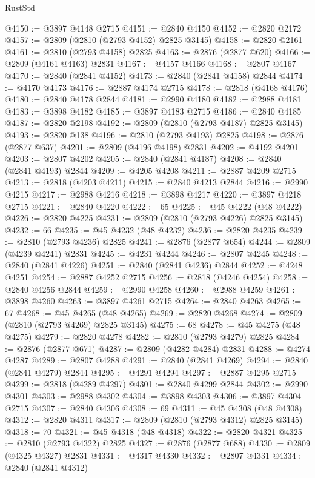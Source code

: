 \begin{lexlean}{RustStd}
\begin{coremodule}
@4150 := @3897 @4148 @2715
@4151 := @2840 @4150
@4152 := @2820 @2172
@4157 := @2809 (@2810 (@2793 @4152) @2825 @3145)
@4158 := @2820 @2161
@4161 := @2810 (@2793 @4158) @2825
@4163 := @2876 (@2877 @620)
@4166 := @2809 (@4161 @4163) @2831
@4167 := @4157 @4166
@4168 := @2807 @4167
@4170 := @2840 (@2841 @4152)
@4173 := @2840 (@2841 @4158) @2844
@4174 := @4170 @4173
@4176 := @2887 @4174 @2715
@4178 := @2818 (@4168 @4176)
@4180 := @2840 @4178 @2844
@4181 := @2990 @4180
@4182 := @2988 @4181
@4183 := @3898 @4182
@4185 := @3897 @4183 @2715
@4186 := @2840 @4185
@4187 := @2820 @2198
@4192 := @2809 (@2810 (@2793 @4187) @2825 @3145)
@4193 := @2820 @138
@4196 := @2810 (@2793 @4193) @2825
@4198 := @2876 (@2877 @637)
@4201 := @2809 (@4196 @4198) @2831
@4202 := @4192 @4201
@4203 := @2807 @4202
@4205 := @2840 (@2841 @4187)
@4208 := @2840 (@2841 @4193) @2844
@4209 := @4205 @4208
@4211 := @2887 @4209 @2715
@4213 := @2818 (@4203 @4211)
@4215 := @2840 @4213 @2844
@4216 := @2990 @4215
@4217 := @2988 @4216
@4218 := @3898 @4217
@4220 := @3897 @4218 @2715
@4221 := @2840 @4220
@4222 := 65
@4225 := @45 @4222 (@48 @4222)
@4226 := @2820 @4225
@4231 := @2809 (@2810 (@2793 @4226) @2825 @3145)
@4232 := 66
@4235 := @45 @4232 (@48 @4232)
@4236 := @2820 @4235
@4239 := @2810 (@2793 @4236) @2825
@4241 := @2876 (@2877 @654)
@4244 := @2809 (@4239 @4241) @2831
@4245 := @4231 @4244
@4246 := @2807 @4245
@4248 := @2840 (@2841 @4226)
@4251 := @2840 (@2841 @4236) @2844
@4252 := @4248 @4251
@4254 := @2887 @4252 @2715
@4256 := @2818 (@4246 @4254)
@4258 := @2840 @4256 @2844
@4259 := @2990 @4258
@4260 := @2988 @4259
@4261 := @3898 @4260
@4263 := @3897 @4261 @2715
@4264 := @2840 @4263
@4265 := 67
@4268 := @45 @4265 (@48 @4265)
@4269 := @2820 @4268
@4274 := @2809 (@2810 (@2793 @4269) @2825 @3145)
@4275 := 68
@4278 := @45 @4275 (@48 @4275)
@4279 := @2820 @4278
@4282 := @2810 (@2793 @4279) @2825
@4284 := @2876 (@2877 @671)
@4287 := @2809 (@4282 @4284) @2831
@4288 := @4274 @4287
@4289 := @2807 @4288
@4291 := @2840 (@2841 @4269)
@4294 := @2840 (@2841 @4279) @2844
@4295 := @4291 @4294
@4297 := @2887 @4295 @2715
@4299 := @2818 (@4289 @4297)
@4301 := @2840 @4299 @2844
@4302 := @2990 @4301
@4303 := @2988 @4302
@4304 := @3898 @4303
@4306 := @3897 @4304 @2715
@4307 := @2840 @4306
@4308 := 69
@4311 := @45 @4308 (@48 @4308)
@4312 := @2820 @4311
@4317 := @2809 (@2810 (@2793 @4312) @2825 @3145)
@4318 := 70
@4321 := @45 @4318 (@48 @4318)
@4322 := @2820 @4321
@4325 := @2810 (@2793 @4322) @2825
@4327 := @2876 (@2877 @688)
@4330 := @2809 (@4325 @4327) @2831
@4331 := @4317 @4330
@4332 := @2807 @4331
@4334 := @2840 (@2841 @4312)

\end{coremodule}
\end{lexlean}
